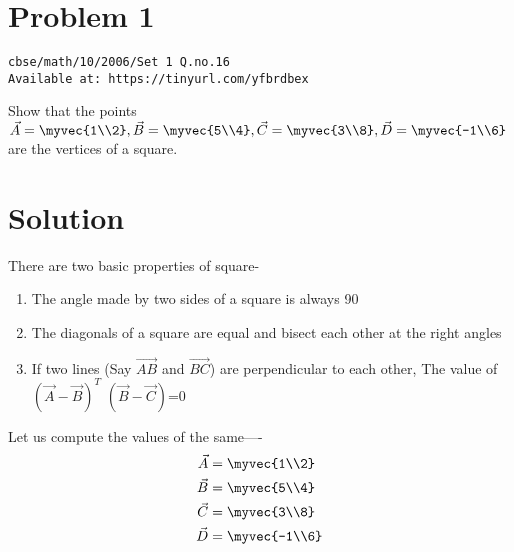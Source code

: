 \documentclass[journal,12pt,twocolumn]{IEEEtran}
\begin{document}
\section{Problem 1}
\begin{lstlisting}
cbse/math/10/2006/Set 1 Q.no.16
Available at: https://tinyurl.com/yfbrdbex
\end{lstlisting}
Show that the points $\vec {A}=\myvec {1\\2},
\vec {B}=\myvec {5\\4},
\vec {C}=\myvec {3\\8},
\vec {D}=\myvec {-1\\6}$ are the vertices of a square.
\section{Solution}
There are two basic properties of square-
\begin{lemma}
\begin{enumerate}
     \item The angle made by two sides of a square is always 90\degree
     \item The diagonals of a square are equal and bisect each other at the right angles
     \item If two lines (Say {$\vec{AB}$} and {$\vec{BC}$}) are perpendicular to each other, The value of 
     $(\vec{A}-\vec{B})^T$ $(\vec{B}-\vec{C})$=0
\end{enumerate}
\end{lemma}
Let us compute the values of the same----
\begin{align}
\vec {A} &=\myvec {1\\2}\\
\vec {B}&=\myvec {5\\4}\\
\vec {C}&=\myvec {3\\8}\\
\vec {D}&=\myvec {-1\\6}
\end{align}
\end{document}
